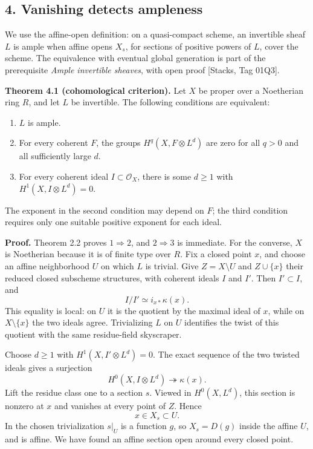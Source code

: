 \documentclass[11pt]{article}
\providecommand{\tightlist}{\setlength{\itemsep}{0pt}\setlength{\parskip}{0pt}}
\begin{document}
\subsection{4. Vanishing detects
ampleness}\label{vanishing-detects-ampleness}

We use the affine-open definition: on a quasi-compact scheme, an
invertible sheaf \(L\) is ample when affine opens \(X_s\), for sections
of positive powers of \(L\), cover the scheme. The equivalence with
eventual global generation is part of the prerequisite \emph{Ample
invertible sheaves}, with open proof {[}Stacks, Tag 01Q3{]}.

\textbf{Theorem 4.1 (cohomological criterion).} Let \(X\) be proper over
a Noetherian ring \(R\), and let \(L\) be invertible. The following
conditions are equivalent:

\begin{enumerate}
\def\labelenumi{\arabic{enumi}.}
\tightlist
\item
  \(L\) is ample.
\item
  For every coherent \(F\), the groups \(H^q(X,F\otimes L^d)\) are zero
  for all \(q>0\) and all sufficiently large \(d\).
\item
  For every coherent ideal \(I\subset\mathcal O_X\), there is some
  \(d\ge1\) with \(H^1(X,I\otimes L^d)=0\).
\end{enumerate}

The exponent in the second condition may depend on \(F\); the third
condition requires only one suitable positive exponent for each ideal.

\textbf{Proof.} Theorem 2.2 proves \(1\Rightarrow2\), and
\(2\Rightarrow3\) is immediate. For the converse, \(X\) is Noetherian
because it is of finite type over \(R\). Fix a closed point \(x\), and
choose an affine neighborhood \(U\) on which \(L\) is trivial. Give
\(Z=X\setminus U\) and \(Z\cup\{x\}\) their reduced closed subscheme
structures, with coherent ideals \(I\) and \(I'\). Then \(I'\subset I\),
and \[
I/I'\simeq i_{x*}\kappa(x).
\] This equality is local: on \(U\) it is the quotient by the maximal
ideal of \(x\), while on \(X\setminus\{x\}\) the two ideals agree.
Trivializing \(L\) on \(U\) identifies the twist of this quotient with
the same residue-field skyscraper.

Choose \(d\ge1\) with \(H^1(X,I'\otimes L^d)=0\). The exact sequence of
the two twisted ideals gives a surjection \[
H^0(X,I\otimes L^d)\twoheadrightarrow\kappa(x).
\] Lift the residue class one to a section \(s\). Viewed in
\(H^0(X,L^d)\), this section is nonzero at \(x\) and vanishes at every
point of \(Z\). Hence \[
x\in X_s\subset U.
\] In the chosen trivialization \(s|_U\) is a function \(g\), so
\(X_s=D(g)\) inside the affine \(U\), and is affine. We have found an
affine section open around every closed point.
\end{document}
